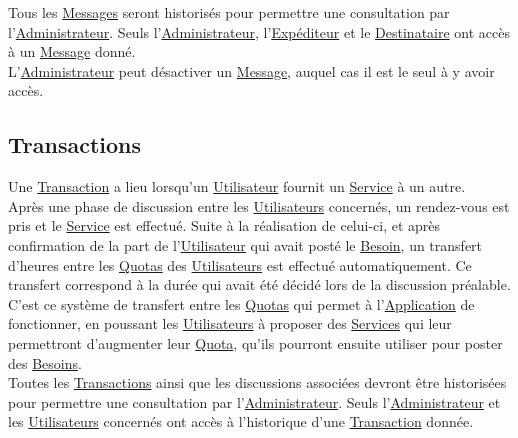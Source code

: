 \documentclass[french,12pt]{article}
\begin{document}
			Tous les \hyperlink{message}{Messages} seront historisés pour permettre
			 une consultation par l’\hyperlink{administrateur}{Administrateur}. Seuls
			 l’\hyperlink{administrateur}{Administrateur},
			 l’\hyperlink{expediteur}{Expéditeur} et le
			 \hyperlink{destinataire}{Destinataire}
			 ont accès à un \hyperlink{message}{Message} donné.\\

			L’\hyperlink{administrateur}{Administrateur} peut désactiver un
			 \hyperlink{message}{Message}, auquel cas il est le seul à y avoir accès.

		\newpage
		\subsection{Transactions}

			Une \hyperlink{transaction}{Transaction} a lieu lorsqu’un
			 \hyperlink{utilisateur}{Utilisateur} fournit un
			 \hyperlink{service}{Service} à un autre.\\
			Après une phase de discussion entre les
			 \hyperlink{utilisateur}{Utilisateurs} concernés, un rendez-vous est pris
			 et le \hyperlink{service}{Service} est effectué. Suite à la réalisation
			 de celui-ci, et après confirmation de la part de
			 l’\hyperlink{utilisateur}{Utilisateur} qui avait posté le
			 \hyperlink{besoin}{Besoin}, un transfert d’heures entre les
			 \hyperlink{quota}{Quotas} des \hyperlink{utilisateur}{Utilisateurs} est
			 effectué automatiquement. Ce transfert correspond à la durée qui avait
			 été décidé lors de la discussion préalable.\\

			C’est ce système de transfert entre les \hyperlink{quota}{Quotas} qui
			 permet à l’\hyperlink{application}{Application} de fonctionner, en
			 poussant les \hyperlink{utilisateur}{Utilisateurs} à proposer des
			 \hyperlink{service}{Services} qui leur permettront d’augmenter leur
			 \hyperlink{quota}{Quota}, qu’ils pourront ensuite utiliser pour poster
			 des \hyperlink{besoin}{Besoins}.\\

			Toutes les \hyperlink{transaction}{Transactions} ainsi que les discussions
			 associées devront être historisées pour permettre une consultation par
			 l’\hyperlink{administrateur}{Administrateur}. Seuls
			 l’\hyperlink{administrateur}{Administrateur} et les
			 \hyperlink{utilisateur}{Utilisateurs} concernés ont accès à l’historique
			 d’une \hyperlink{transaction}{Transaction} donnée.\\
\end{document}
